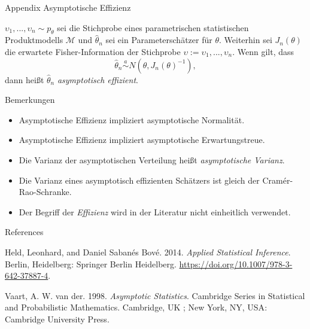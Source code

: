 \documentclass[
  8pt,
  ignorenonframetext,
]{beamer}
\providecommand{\tightlist}{%
  \setlength{\itemsep}{0pt}\setlength{\parskip}{0pt}}
\newlength{\cslhangindent}
\newlength{\cslentryspacingunit} %
\newenvironment{CSLReferences}[2] %
 {%
  \setlength{\parindent}{0pt}
  \ifodd #1
  \let\oldpar\par
  \def\par{\hangindent=\cslhangindent\oldpar}
  \fi
  \setlength{\parskip}{#2\cslentryspacingunit}
 }%
 {}
\newcommand{\ups} {\upsilon}
\begin{document}
\begin{frame}{\small Appendix \textbar{} Asymptotische Effizienz}
\protect\hypertarget{appendix-asymptotische-effizienz}{}
\small
\begin{definition}
\justifying
$\ups_1,...,\ups_n \sim p_\theta$ sei die Stichprobe eines parametrischen statistischen
Produktmodells $\mathcal{M}$ und $\hat{\theta}_n$ sei ein Parameterschätzer für
$\theta$. Weiterhin sei $J_n(\theta)$ die erwartete Fisher-Information der
Stichprobe $\ups := \ups_1,...,\ups_n$. Wenn gilt, dass
\begin{equation}
\hat{\theta}_n \stackrel{a}{\sim} N\left(\theta, J_n(\theta)^{-1}\right),
\end{equation}
dann heißt $\hat{\theta}_n$ \textit{asymptotisch effizient}.
\end{definition}
\footnotesize

Bemerkungen

\begin{itemize}
\tightlist
\item
  Asymptotische Effizienz impliziert asymptotische Normalität.
\item
  Asymptotische Effizienz impliziert asymptotische Erwartungstreue.
\item
  Die Varianz der asymptotischen Verteilung heißt
  \textit{asymptotische Varianz}.
\item
  Die Varianz eines asymptotisch effizienten Schätzers ist gleich der
  Cramér-Rao-Schranke.
\item
  Der Begriff der \textit{Effizienz} wird in der Literatur nicht
  einheitlich verwendet.
\end{itemize}
\end{frame}

\begin{frame}{References}
\protect\hypertarget{references}{}
\footnotesize

\hypertarget{refs}{}
\begin{CSLReferences}{1}{0}
\leavevmode{}%
Held, Leonhard, and Daniel Sabanés Bové. 2014. \emph{Applied
{Statistical Inference}}. {Berlin, Heidelberg}: {Springer Berlin
Heidelberg}. \url{https://doi.org/10.1007/978-3-642-37887-4}.

\leavevmode{}%
Vaart, A. W. van der. 1998. \emph{Asymptotic Statistics}. Cambridge
Series in Statistical and Probabilistic Mathematics. {Cambridge, UK ;
New York, NY, USA}: {Cambridge University Press}.

\end{CSLReferences}
\end{frame}
\end{document}
